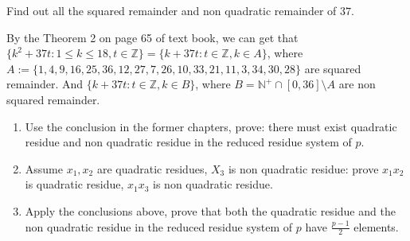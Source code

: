 \documentclass{ctexart}
\begin{document}
\begin{problem}\label{pro:3}
  Find out all the squared remainder and non quadratic remainder of \(37\).
\end{problem}
\begin{solution}
  By the Theorem 2 on page 65 of text book, we can get that \(\{k^2 + 37t:1 \leq k \leq 18, t \in \mathbb{Z}\}=\{k + 37 t: t \in \mathbb{Z}, k \in A\}\),
  where \(A:=\{1,4,9,16,25,36,12,27,7,26,10,33,21,11,3,34,30,28\}\) are squared remainder.
  And \(\{k + 37t: t \in \mathbb{Z}, k \in B\}\), where \(B=\mathbb{N}^+ \cap[0,36] \setminus A\) are non
  squared remainder.
\end{solution}
\begin{problem}\label{pro:4}
  \begin{enumerate}
    \item Use the conclusion in the former chapters, prove: there must exist quadratic residue and
      non quadratic residue in the reduced residue system of \(p\).
    \item Assume \(x_1,x_2\) are quadratic residues, \(X_3\) is non quadratic residue:
      prove \(x_1x_2\) is quadratic residue, \(x_1x_3\) is non quadratic residue.
    \item Apply the conclusions above, prove that both the quadratic residue and the non quadratic residue
      in the reduced residue system of \(p\) have
      \(\frac{p-1}{2}\) elements.
  \end{enumerate}
\end{problem}
\end{document}
